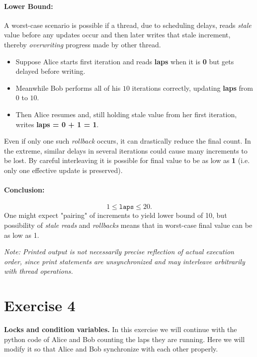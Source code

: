 \documentclass{article}
\newcommand{\exercise}[1]{
    \section*{Exercise #1}
    \markboth{Exercise #1}{}
}
\begin{document}
\begin{enumerate}[label=\textbf{\makebox[1cm][l]{\Huge\text{(\stylishfont\alph*)}}}, leftmargin=!, labelindent=0pt]
\paragraph{Lower Bound:}
A worst-case scenario is possible if a thread, due to scheduling delays, reads
\emph{stale} value before any updates occur and then later writes that
stale increment, thereby \emph{overwriting} progress made by other thread.
\begin{itemize}
    \item Suppose Alice starts first iteration and reads
    \textbf{laps} when it is \textbf{0} but gets delayed before writing.
    \item Meanwhile Bob performs all of his $10$ iterations correctly,
    updating \textbf{laps} from $0$ to $10$.
    \item Then Alice resumes and, still holding stale value from
    her first iteration, writes \textbf{laps = 0 + 1 = 1}.
\end{itemize}
Even if only one such \emph{rollback} occurs, it can drastically
reduce the final count. In the extreme, similar delays in several
iterations could cause many increments to be lost. By careful
interleaving it is possible for final value to be as low as
\textbf{1} (i.e. only one effective update is preserved).

\paragraph{Conclusion:}
\[
1 \le \texttt{laps} \le 20.
\]
One might expect "pairing" of increments to yield lower bound
of 10, but possibility of \emph{stale reads} and \emph{rollbacks}
means that in worst-case final value can be as low as 1.


\emph{Note: Printed output is not necessarily precise reflection
of actual execution order, since print statements are unsynchronized
and may interleave arbitrarily with thread operations.}

\end{enumerate}



\newpage

\exercise{4}
\textbf{Locks and condition variables.} In this exercise we will
continue with the python code of Alice and Bob counting the laps
they are running. Here we will modify it so that Alice and Bob
synchronize with each other properly.
\end{document}
